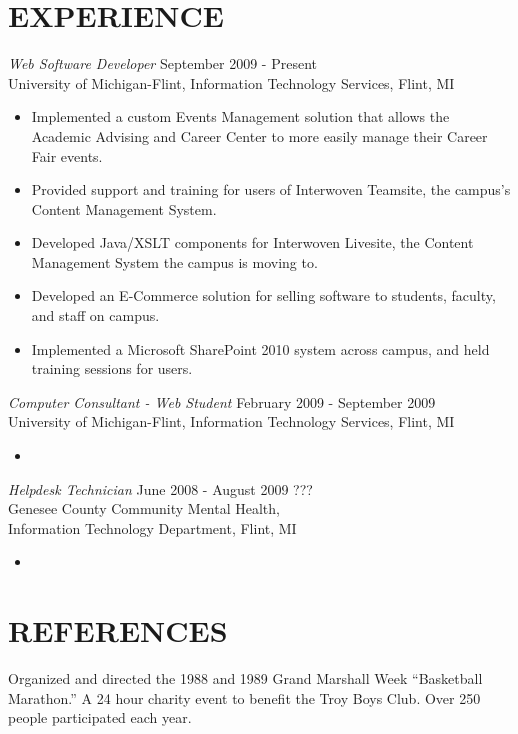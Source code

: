 \documentclass[line,margin]{res}
\begin{document}
\begin{resume}
\section{EXPERIENCE} {\sl Web Software Developer } \hfill September 2009 - Present \\
                University of Michigan-Flint, 
                Information Technology Services, Flint, MI
                 \begin{itemize}  \itemsep -2pt %
                    \item Implemented a custom Events Management solution that
                          allows the Academic Advising and Career Center to
                          more easily manage their Career Fair events.
                    \item Provided support and training for users of Interwoven
                          Teamsite, the campus's Content Management System.
                    \item Developed Java/XSLT components for Interwoven Livesite, the
                          Content Management System the campus is moving to.
                    \item Developed an E-Commerce solution for selling software
                          to students, faculty, and staff on campus.
                    \item Implemented a Microsoft SharePoint 2010 system across
                          campus, and held training sessions for users.
                \end{itemize}

                {\sl Computer Consultant - Web Student } \hfill February 2009 - September 2009 \\
                University of Michigan-Flint,
                Information Technology Services, Flint, MI
                 \begin{itemize}  \itemsep -2pt %
                     \item
                 \end{itemize}

                {\sl Helpdesk Technician} \hfill June 2008 - August 2009 ??? \\
                Genesee County Community Mental Health, \\
                Information Technology Department, Flint, MI
                  \begin{itemize}
                       \item
                   \end{itemize}

\section{REFERENCES}  Organized and directed the 1988 and 1989 Grand 
                 Marshall Week \newline ``Basketball Marathon.'' A 24 hour 
                charity event to benefit the Troy Boys Club. Over 
                250 people participated each year. 


\end{resume}
\end{document}
